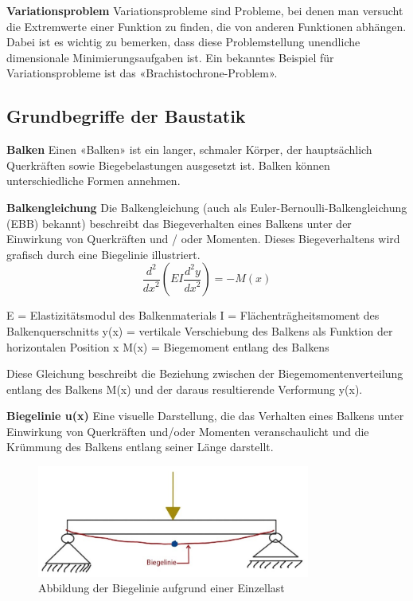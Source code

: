 \textbf{Variationsproblem}
Variationsprobleme sind Probleme, bei denen man versucht die Extremwerte einer Funktion zu finden, die von anderen Funktionen abhängen.
Dabei ist es wichtig zu bemerken, dass diese Problemstellung unendliche dimensionale Minimierungsaufgaben ist.
Ein bekanntes Beispiel für Variationsprobleme ist das «Brachistochrone-Problem».

\subsection{Grundbegriffe der Baustatik}
\textbf{Balken}
Einen «Balken» ist ein langer, schmaler Körper, der hauptsächlich Querkräften sowie Biegebelastungen ausgesetzt ist.
Balken können unterschiedliche Formen annehmen.

\textbf{Balkengleichung}
Die Balkengleichung (auch als Euler-Bernoulli-Balkengleichung (EBB) bekannt) beschreibt das Biegeverhalten eines Balkens unter der Einwirkung von Querkräften und / oder Momenten.
Dieses Biegeverhaltens wird grafisch durch eine Biegelinie illustriert.
\begin{equation}
	\frac{d^2}{{dx}^2}\left(EI\frac{d^2y}{{dx}^2}\right)
	=-M(x)
\end{equation}

E = Elastizitätsmodul des Balkenmaterials
I = Flächenträgheitsmoment des Balkenquerschnitts
y(x) = vertikale Verschiebung des Balkens als Funktion der horizontalen Position x
M(x) = Biegemoment entlang des Balkens

Diese Gleichung beschreibt die Beziehung zwischen der Biegemomentenverteilung entlang des Balkens M(x) und der daraus resultierende Verformung y(x).

\textbf{Biegelinie u(x)}
Eine visuelle Darstellung, die das Verhalten eines Balkens unter Einwirkung von Querkräften und/oder Momenten veranschaulicht und die Krümmung des Balkens entlang seiner Länge darstellt.
\begin{figure} [h]
	\centering
	\includegraphics[width=0.8\textwidth]{papers/balken/images/teil1/Biegelinie1.jpg}
	\caption{Abbildung der Biegelinie aufgrund einer Einzellast}
	\label{fig:Abbildung der Biegelinie aufgrund einer Einzellast}
\end{figure}

